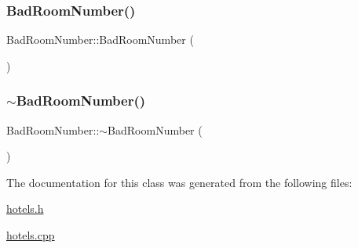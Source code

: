 \subsubsection{\texorpdfstring{Bad\+Room\+Number()}{BadRoomNumber()}}
{\footnotesize\ttfamily Bad\+Room\+Number\+::\+Bad\+Room\+Number (\begin{DoxyParamCaption}{ }\end{DoxyParamCaption})\hspace{0.3cm}{\ttfamily [inline]}}

\mbox{\label{class_bad_room_number_a3691fb5baacd1a49aa96fd6ed7256ef8}} 
\subsubsection{\texorpdfstring{$\sim$\+Bad\+Room\+Number()}{~BadRoomNumber()}}
{\footnotesize\ttfamily Bad\+Room\+Number\+::$\sim$\+Bad\+Room\+Number (\begin{DoxyParamCaption}{ }\end{DoxyParamCaption})\hspace{0.3cm}{\ttfamily [virtual]}}



The documentation for this class was generated from the following files\+:\begin{DoxyCompactItemize}
\item 
\hyperlink{hotels_8h}{hotels.\+h}\item 
\hyperlink{hotels_8cpp}{hotels.\+cpp}\end{DoxyCompactItemize}
